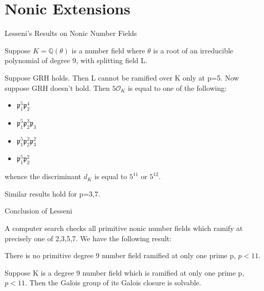 \documentclass[10pt]{beamer}
\theoremstyle{plain} %
\begin{document}
\section{Nonic Extensions}
\begin{frame}{Lesseni's Results on Nonic Number Fields}
\pause

   Suppose $K=\mathbb{Q}(\theta)$ is a number field where $\theta$ is a root of an irreducible polynomial of degree 9, with splitting field L.
   \pause
\begin{theorem}
    Suppose GRH holds. Then L cannot be ramified over K only at p=5. Now suppose GRH doesn't hold. Then $5\mathcal{O}_K$ is equal to one of the following: \begin{itemize}
        \item $\mathfrak{p}_1^5\mathfrak{p}_2^4$
        \item $\mathfrak{p}_1^5\mathfrak{p}_2^3\mathfrak{p}_3$
        \item $\mathfrak{p}_1^5\mathfrak{p}_2^2\mathfrak{p}_3^2$
        \item  $\mathfrak{p}_1^5\mathfrak{p}_2^2$
    \end{itemize}
    whence the discriminant $d_K$ is equal to $5^{11}$ or $5^{12}$. 
\end{theorem} 
\pause

Similar results hold for p=3,7. 
\end{frame}
\begin{frame}{Conclusion of Lesseni}
\pause

    A computer search checks all primitive nonic number fields which ramify at precisely one of 2,3,5,7. We have the following result:
    \pause

    \begin{theorem}
    There is no primitive degree 9 number field ramified at only one prime p, $p<11$.
\end{theorem}
\pause

\begin{corollary}
 Suppose K is a degree 9 number field which is ramified at only one prime p, $p<11$. Then the Galois group of its Galois closure is solvable. 
\end{corollary}
\end{frame}
\end{document}
